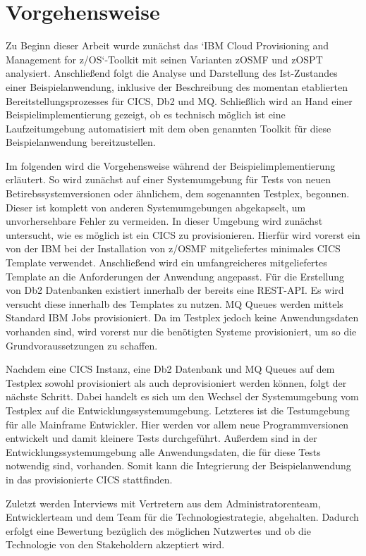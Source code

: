 \chapter{Vorgehensweise}\label{ch:vorgehensweise}
Zu Beginn dieser Arbeit wurde zunächst das `IBM Cloud Provisioning and Management for z/OS`-Toolkit mit seinen Varianten zOSMF und zOSPT analysiert.
Anschließend folgt die Analyse und Darstellung des Ist-Zustandes einer Beispielanwendung, inklusive der Beschreibung des momentan etablierten Bereitstellungsprozesses für CICS, Db2 und MQ.
Schließlich wird an Hand einer Beispielimplementierung gezeigt, ob es technisch möglich ist eine Laufzeitumgebung automatisiert mit dem oben genannten Toolkit für diese Beispielanwendung bereitzustellen.

Im folgenden wird die Vorgehensweise während der Beispielimplementierung erläutert.
So wird zunächst auf einer Systemumgebung für Tests von neuen Betirebssystemversionen oder ähnlichem, dem sogenannten Testplex, begonnen.
Dieser ist komplett von anderen Systemumgebungen abgekapselt, um unvorhersehbare Fehler zu vermeiden.
In dieser Umgebung wird zunächst untersucht, wie es möglich ist ein CICS zu provisionieren.
Hierfür wird vorerst ein von der IBM bei der Installation von z/OSMF mitgeliefertes minimales CICS Template verwendet.
Anschließend wird ein umfangreicheres mitgeliefertes Template an die Anforderungen der Anwendung angepasst.
Für die Erstellung von Db2 Datenbanken existiert innerhalb der bereits eine REST-API.
Es wird versucht diese innerhalb des Templates zu nutzen.
MQ Queues werden mittels Standard IBM Jobs provisioniert.
Da im Testplex jedoch keine Anwendungsdaten vorhanden sind, wird vorerst nur die benötigten Systeme provisioniert, um so die Grundvoraussetzungen zu schaffen.

Nachdem eine CICS Instanz, eine Db2 Datenbank und MQ Queues auf dem Testplex sowohl provisioniert als auch deprovisioniert werden können, folgt der nächste Schritt.
Dabei handelt es sich um den Wechsel der Systemumgebung vom Testplex auf die Entwicklungssystemumgebung.
Letzteres ist die Testumgebung für alle Mainframe Entwickler.
Hier werden vor allem neue Programmversionen entwickelt und damit kleinere Tests durchgeführt.
Außerdem sind in der Entwicklungssystemumgebung alle Anwendungsdaten, die für diese Tests notwendig sind, vorhanden.
Somit kann die Integrierung der Beispielanwendung in das provisionierte CICS stattfinden.

Zuletzt werden Interviews mit Vertretern aus dem Administratorenteam, Entwicklerteam und dem Team für die Technologiestrategie, abgehalten.
Dadurch erfolgt eine Bewertung bezüglich des möglichen Nutzwertes und ob die Technologie von den Stakeholdern akzeptiert wird.